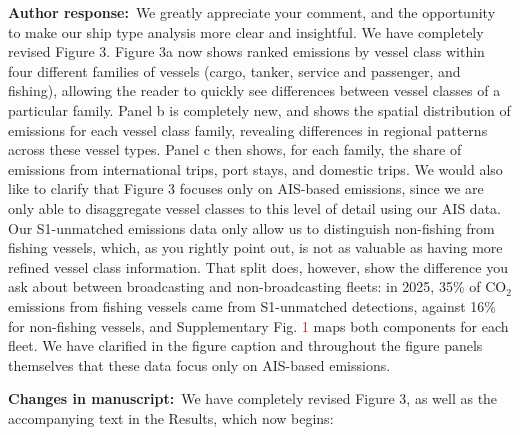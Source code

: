 \documentclass[11pt]{article}
\newcommand{\response}{\par\medskip\noindent%
  \textbf{\textcolor{respblue}{Author response:}}\ }
\newcommand{\changes}{\par\medskip\noindent%
  \textbf{\textcolor{changegreen}{Changes in manuscript:}}\ }
\begin{document}
\response We greatly appreciate your comment, and the opportunity to make our ship type analysis more clear and insightful. We have completely revised Figure 3. Figure 3a now shows ranked emissions by vessel class within four different families of vessels (cargo, tanker, service and passenger, and fishing), allowing the reader to quickly see differences between vessel classes of a particular family. Panel b is completely new, and shows the spatial distribution of emissions for each vessel class family, revealing differences in regional patterns across these vessel types. Panel c then shows, for each family, the share of emissions from international trips, port stays, and domestic trips. We would also like to clarify that Figure 3 focuses only on AIS-based emissions, since we are only able to disaggregate vessel classes to this level of detail using our AIS data. Our S1-unmatched emissions data only allow us to distinguish non-fishing from fishing vessels, which, as you rightly point out, is not as valuable as having more refined vessel class information. That split does, however, show the difference you ask about between broadcasting and non-broadcasting fleets: in 2025, 35\% of CO$_{2}$ emissions from fishing vessels came from S1-unmatched detections, against 16\% for non-fishing vessels, and Supplementary Fig. \textcolor{red}{1} maps both components for each fleet. We have clarified in the figure caption and throughout the figure panels themselves that these data focus only on AIS-based emissions.

\changes We have completely revised Figure 3, as well as the accompanying text in the Results, which now begins:
\end{document}
